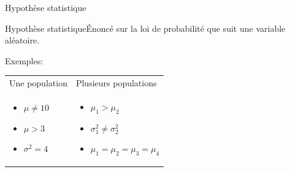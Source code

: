 \documentclass{BeamerTemplate}
\begin{document}
\begin{frame}[t]{Hypothèse statistique}

\begin{Boite}{Hypothèse statistique}{Énoncé sur la loi de probabilité que suit une variable aléatoire.}
\end{Boite}

\medskip
Exemples:%
\medskip

\begin{tabular}{p{5cm}p{5cm}}
Une population & Plusieurs populations\\
\begin{itemize}
\item $\mu \ne 10$
\item $\mu > 3$
\item $\sigma^2 = 4$
\end{itemize}
&
\begin{itemize}
\item $\mu_1 > \mu_2$
\item $\sigma^2_1 \ne \sigma^2_2$
\item $\mu_1=\mu_2=\mu_3=\mu_4$
\end{itemize}
\end{tabular}
\end{frame}








\end{document}
